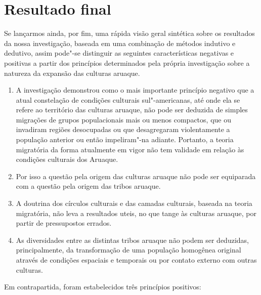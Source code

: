 \chapter{Resultado final}

Se lançarmos ainda, por fim, uma rápida visão geral sintética sobre os
resultados da nossa investigação, baseada em uma combinação de métodos
indutivo e dedutivo, assim pode"-se distinguir as seguintes
características negativas e positivas a partir dos princípios
determinados pela própria investigação sobre a natureza da expansão das
culturas aruaque.

\begin{enumerate}
\def\labelenumi{\arabic{enumi}.}
\item
  A investigação demonstrou como o mais importante princípio negativo
  que a atual constelação de condições culturais sul"-americanas, até
  onde ela se refere ao território das culturas aruaque, não pode ser
  deduzida de simples migrações de grupos populacionais mais ou menos
  compactos, que ou invadiram regiões desocupadas ou que desagregaram
  violentamente a população anterior ou então impeliram"-na adiante.
  Portanto, a teoria migratória da forma atualmente em vigor não tem
  validade em relação às condições culturais dos Aruaque.
\item
  Por isso a questão pela origem das culturas aruaque não pode ser
  equiparada com a questão pela origem das tribos aruaque.
\item
  A doutrina dos círculos culturais e das camadas culturais, baseada na
  teoria migratória, não leva a resultados uteis, no que tange às
  culturas aruaque, por partir de pressupostos errados.
\item
  As diversidades entre as distintas tribos aruaque não podem ser
  deduzidas, principalmente, da transformação de uma população
  homogênea original através de condições espaciais e temporais ou por
  contato externo com outras culturas.
\end{enumerate}

Em contrapartida, foram estabelecidos três princípios positivos:

